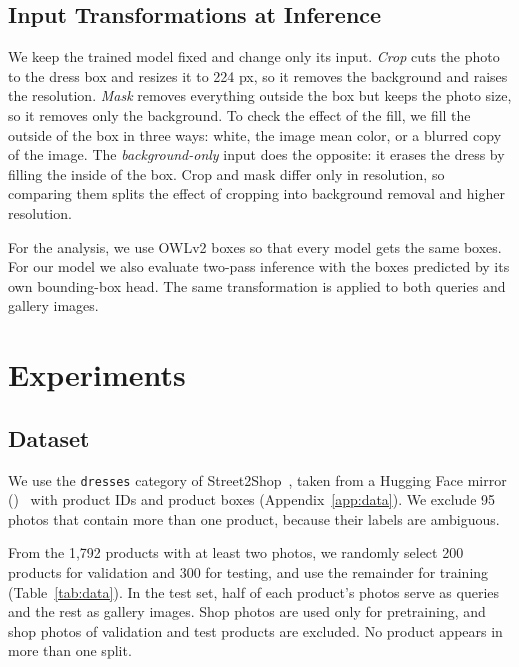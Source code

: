 \documentclass[sigconf,nonacm]{acmart}
\begin{document}
\subsection{Input Transformations at Inference}

We keep the trained model fixed and change only its input. \emph{Crop} cuts the photo to the dress box and resizes it to 224 px, so it removes the background and raises the resolution. \emph{Mask} removes everything outside the box but keeps the photo size, so it removes only the background. To check the effect of the fill, we fill the outside of the box in three ways: white, the image mean color, or a blurred copy of the image. The \emph{background-only} input does the opposite: it erases the dress by filling the inside of the box. Crop and mask differ only in resolution, so comparing them splits the effect of cropping into background removal and higher resolution.

For the analysis, we use OWLv2 boxes so that every model gets the same boxes. For our model we also evaluate two-pass inference with the boxes predicted by its own bounding-box head. The same transformation is applied to both queries and gallery images.

\section{Experiments}

\subsection{Dataset}

We use the \texttt{dresses} category of Street2Shop~\cite{kiapour2015}, taken from a Hugging Face mirror ()~\cite{street2shopmirror} with product IDs and product boxes (Appendix~\ref{app:data}). We exclude 95 photos that contain more than one product, because their labels are ambiguous.

From the 1,792 products with at least two photos, we randomly select 200 products for validation and 300 for testing, and use the remainder for training (Table~\ref{tab:data}). In the test set, half of each product's photos serve as queries and the rest as gallery images. Shop photos are used only for pretraining, and shop photos of validation and test products are excluded. No product appears in more than one split.
\end{document}
